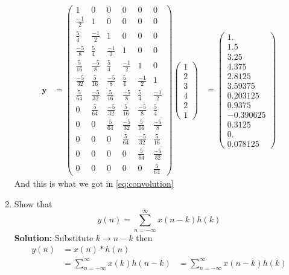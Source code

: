 \documentclass[journal,12pt,twocolumn]{IEEEtran}
\newcommand{\solution}{\noindent \textbf{Solution: }}
\let\vec\mathbf
\numberwithin{equation}{section}
\renewcommand\thesection{\arabic{section}}
\newcommand{\myvec}[1]{\ensuremath{\begin{pmatrix}#1\end{pmatrix}}}
\begin{document}
\begin{enumerate}[label=\thesection.\arabic*]
\begin{align}
\vec{y}&=\myvec{1 & 0&0 & 0 & 0 & 0 \\ \frac{-1}{2} & 1&0&0&0&0\\\frac{5}{4}&\frac{-1}{2}&1&0&0&0\\\frac{-5}{8}&\frac{5}{4}&\frac{-1}{2}&1&0&0\\\frac{5}{16}&\frac{-5}{8}&\frac{5}{4}&\frac{-1}{2}&1&0\\ \frac{-5}{32}&\frac{5}{16}&\frac{-5}{8}&\frac{5}{4}&\frac{-1}{2}&1\\\frac{5}{64}&\frac{-5}{32}&\frac{5}{16}&\frac{-5}{8}&\frac{5}{4}&\frac{-1}{2}\\ 0&\frac{5}{64}&\frac{-5}{32}&\frac{5}{16}&\frac{-5}{8}&\frac{5}{4}\\0&0&\frac{5}{64}&\frac{-5}{32}&\frac{5}{16}&\frac{-5}{8}\\0&0&0&\frac{5}{64}&\frac{-5}{32}&\frac{5}{16}\\0&0&0&0&\frac{5}{64}&\frac{-5}{32}\\0&0&0&0&0&\frac{5}{64}}\myvec{1\\2\\3\\4\\2\\1}
&=\myvec{1.   \\     1.5\\3.25\\4.375\\2.8125   \\3.59375\\   0.203125\\
  0.9375  \\ -0.390625 \\ 0.3125   \\ 0.     \\	   0.078125}
\end{align}
And this is what we got in \eqref{eq:convolution}
\item Show that
\begin{equation}
y(n) =  \sum_{n=-\infty}^{\infty}x(n-k)h(k)
\end{equation}
\solution Substitute $k\to n-k$ then \begin{align}
y(n) &=  x(n)*h(n)\\
&=\sum_{n=-\infty}^{\infty}x(k)h(n-k)
&= \sum_{n=-\infty}^{\infty}x(n-k)h(k)
\end{align}
\end{enumerate}
%
\end{document}
